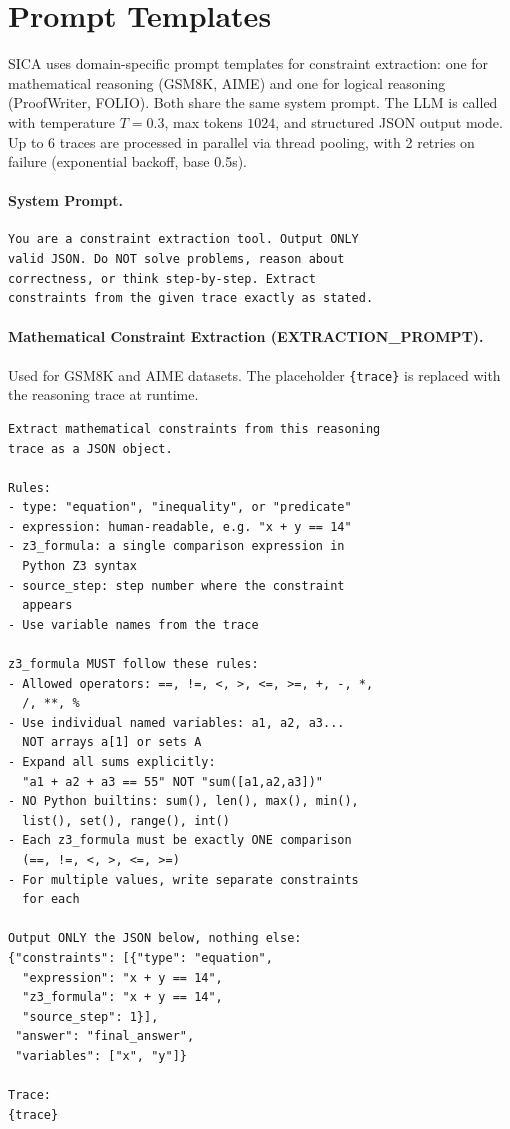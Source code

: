 \section{Prompt Templates}
\label{app:prompts}

SICA uses domain-specific prompt templates for constraint extraction: one for mathematical reasoning (GSM8K, AIME) and one for logical reasoning (ProofWriter, FOLIO). Both share the same system prompt. The LLM is called with temperature $T{=}0.3$, max tokens $1024$, and structured JSON output mode. Up to 6 traces are processed in parallel via thread pooling, with 2 retries on failure (exponential backoff, base 0.5s).

\paragraph{System Prompt.}\leavevmode

\begin{lstlisting}
You are a constraint extraction tool. Output ONLY
valid JSON. Do NOT solve problems, reason about
correctness, or think step-by-step. Extract
constraints from the given trace exactly as stated.
\end{lstlisting}

\paragraph{Mathematical Constraint Extraction (EXTRACTION\_PROMPT).}

Used for GSM8K and AIME datasets. The placeholder \texttt{\{trace\}} is replaced with the reasoning trace at runtime.

\begin{lstlisting}
Extract mathematical constraints from this reasoning
trace as a JSON object.

Rules:
- type: "equation", "inequality", or "predicate"
- expression: human-readable, e.g. "x + y == 14"
- z3_formula: a single comparison expression in
  Python Z3 syntax
- source_step: step number where the constraint
  appears
- Use variable names from the trace

z3_formula MUST follow these rules:
- Allowed operators: ==, !=, <, >, <=, >=, +, -, *,
  /, **, %
- Use individual named variables: a1, a2, a3...
  NOT arrays a[1] or sets A
- Expand all sums explicitly:
  "a1 + a2 + a3 == 55" NOT "sum([a1,a2,a3])"
- NO Python builtins: sum(), len(), max(), min(),
  list(), set(), range(), int()
- Each z3_formula must be exactly ONE comparison
  (==, !=, <, >, <=, >=)
- For multiple values, write separate constraints
  for each

Output ONLY the JSON below, nothing else:
{"constraints": [{"type": "equation",
  "expression": "x + y == 14",
  "z3_formula": "x + y == 14",
  "source_step": 1}],
 "answer": "final_answer",
 "variables": ["x", "y"]}

Trace:
{trace}
\end{lstlisting}

